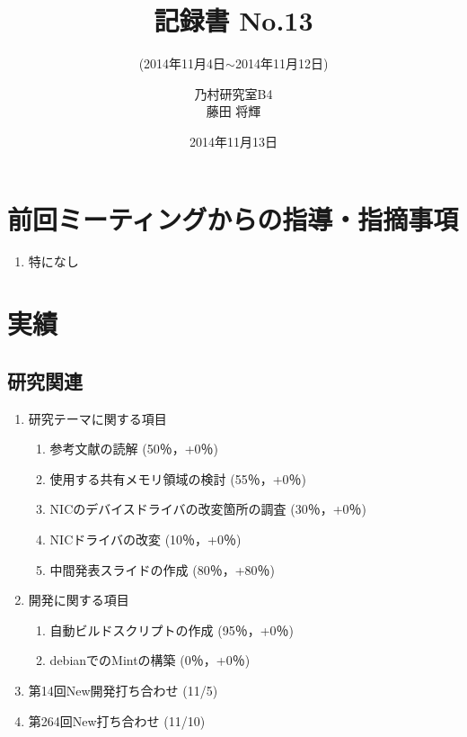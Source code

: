 \documentclass[fleqn, 14pt]{extarticle}
\subtitle{(2014年11月4日$\sim$2014年11月12日)}
\author{乃村研究室B4\\藤田 将輝}
\date{2014年11月13日}
\title{記録書 No.13}
\begin{document}
\maketitle




\section{前回ミーティングからの指導・指摘事項}
\label{sec-1}
\begin{enumerate}
\item 特になし
\newline
\hfill

\end{enumerate}




\section{実績}
\label{sec-2}

\subsection{研究関連}
\label{sec-2-1}
\begin{enumerate}
\item 研究テーマに関する項目
\hfill
\label{enum-research1}
\begin{enumerate}

\item 参考文献の読解
\hfill
\label{enum-1-A}
(50％，+0％)
\item 使用する共有メモリ領域の検討
\hfill
\label{enum-1-B}
(55％，+0％)
\item NICのデバイスドライバの改変箇所の調査
\hfill
\label{enum-1-C}
(30％，+0％)
\item NICドライバの改変
\hfill
\label{enum-1-D}
(10％，+0％)
\item 中間発表スライドの作成
\hfill
\label{enum-1-E}
(80％，+80％)
\end{enumerate}
\item 開発に関する項目
\hfill
\label{enum-research2}
\begin{enumerate}

\item 自動ビルドスクリプトの作成
\hfill
\label{enum-2-A}
(95％，+0％)
\item debianでのMintの構築
\hfill
\label{enum-2-A}
(0％，+0％)
\end{enumerate}

\item 第14回New開発打ち合わせ
\hfill
\label{enum-3}
(11/5)
\item 第264回New打ち合わせ
\hfill
\label{enum-4}
(11/10)



\end{enumerate}
\end{document}
